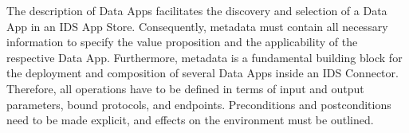 The description of Data Apps facilitates the discovery and selection of a Data App in an IDS App Store. Consequently, metadata must contain all necessary information to specify the value proposition and the applicability of the respective Data App. Furthermore, metadata is a fundamental building block for the deployment and composition of several Data Apps inside an IDS Connector. Therefore, all operations have to be defined in terms of input and output parameters, bound protocols, and endpoints. Preconditions and postconditions need to be made explicit, and effects on the environment must be outlined.
